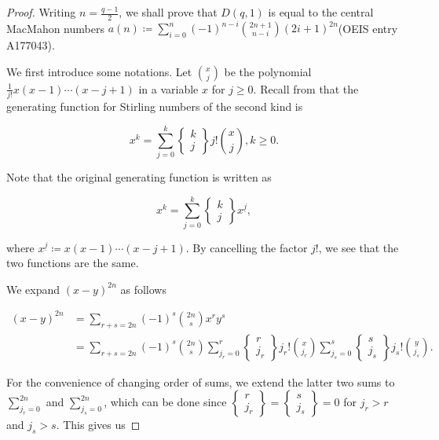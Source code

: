 \documentclass[11pt]{article}
\begin{document}
\begin{proof}

Writing \(n = \frac{q-1}{2}\), we shall prove that \(D(q, 1)\) is equal to the central MacMahon numbers \(a(n)\coloneqq \sum_{i = 0}^n(-1)^{n-i}\binom{2n+1}{n-i}(2i+1)^{2n}\)(OEIS entry A177043). 

We first introduce some notations. Let \(\binom{x}{j}\) be the polynomial \(\frac{1}{j!}x(x-1)\cdots (x-j+1)\) in a variable \(x\) for \(j\geq 0\). Recall from \cite[Section 6.1]{graham1989concrete} that the generating function for Stirling numbers of the second kind is 

\[
x^k = \sum_{j = 0}^k \begin{Bmatrix}
    k\\ j
\end{Bmatrix}j!\binom{x}{j}, k\geq 0.
\]

Note that the original generating function is written as 

\[
x^k = \sum_{j = 0}^k\begin{Bmatrix}
    k\\ j
\end{Bmatrix}x^{\underline{j}},
\]

where \(x^{\underline{j}}\coloneqq x(x - 1)\cdots (x - j + 1)\). By cancelling the factor \(j!\), we see that the two functions are the same. 

We expand \((x - y)^{2n}\) as follows 

\begin{align*}
    (x - y)^{2n} &= \sum_{r + s = 2n}(-1)^s\binom{2n}{s}x^r y^s\\ 
    &= \sum_{r + s = 2n}(-1)^s\binom{2n}{s}\sum_{j_r = 0}^r\begin{Bmatrix}
        r\\ j_r
    \end{Bmatrix}j_r!\binom{x}{j_r}\sum_{j_s = 0}^s\begin{Bmatrix}
        s\\ j_s
    \end{Bmatrix}j_s!\binom{y}{j_s}.
\end{align*}

For the convenience of changing order of sums, we extend the latter two sums to \(\sum_{j_r = 0}^{2n}\) and \(\sum_{j_s = 0}^{2n}\), which can be done since \(\begin{Bmatrix}
    r\\ j_r
\end{Bmatrix} = \begin{Bmatrix}
    s\\ j_s
\end{Bmatrix} = 0\) for \(j_r > r\) and \(j_s > s\). This gives us 


\end{proof}
\end{document}
